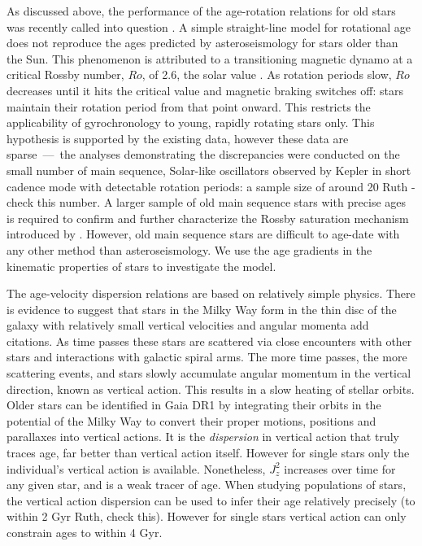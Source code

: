 \documentclass[useAMS, usenatbib, preprint, 12pt]{aastex}
\newcommand{\racomment}[1]{{\color{red}#1}}
\begin{document}
As discussed above, the performance of the age-rotation relations for old
stars was recently called into question \citep{Angus2015, Vansaders2016,
Metcalfe2016}.
A simple straight-line model for rotational age does not reproduce the ages
predicted by asteroseismology for stars older than the Sun.
This phenomenon is attributed to a transitioning magnetic dynamo at a critical
Rossby number, $Ro$, of 2.6, the solar value \citep{Vansaders2016}.
As rotation periods slow, $Ro$ decreases until it hits the critical value and
magnetic braking switches off: stars maintain their rotation period from that
point onward.
This restricts the applicability of gyrochronology to young, rapidly rotating
stars only.
This hypothesis is supported by the existing data, however these data are
sparse~---~the analyses demonstrating the discrepancies were conducted on the
small number of main sequence, Solar-like oscillators observed by Kepler in
short cadence mode with detectable rotation periods: a sample size of around
20 \racomment{Ruth - check this number}.
A larger sample of old main sequence stars with precise ages is required to
confirm and further characterize the Rossby saturation mechanism introduced by
\citep{Vansaders2016}.
However, old main sequence stars are difficult to age-date with any other
method than asteroseismology.
We use the age gradients in the kinematic properties of stars to investigate
the \citet{Vansaders2016} model.

The age-velocity dispersion relations are based on relatively simple physics.
There is evidence to suggest that stars in the Milky Way form in the thin disc
of the galaxy with relatively small vertical velocities and angular momenta
\racomment{add citations}.
As time passes these stars are scattered via close encounters with other
stars and interactions with galactic spiral arms.
The more time passes, the more scattering events, and stars slowly accumulate
angular momentum in the vertical direction, known as vertical action.
This results in a slow heating of stellar orbits.
Older stars can be identified in Gaia DR1 by integrating their orbits in the
potential of the Milky Way to convert their proper motions, positions and
parallaxes into vertical actions.
It is the {\it dispersion} in vertical action that truly traces age, far
better than vertical action itself.
However for single stars only the individual's vertical action is available.
Nonetheless, $J_z^2$ increases over time for any given star, and is a weak
tracer of age.
When studying populations of stars, the vertical action dispersion can be used
to infer their age relatively precisely (to within 2 Gyr
\racomment{Ruth, check this}).
However for single stars vertical action can only constrain ages to within 4
Gyr.
\end{document}
